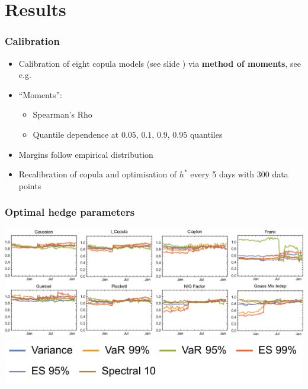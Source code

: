 \documentclass[10pt,mathserif]{beamer}
\renewcommand{\(}{\begin{columns}}
\renewcommand{\)}{\end{columns}}
\newcommand{\<}[1]{\begin{column}{#1}}
\renewcommand{\>}{\end{column}}
\theoremstyle{definition}
\begin{document}
\section{Results}

\begin{frame}
  \frametitle{Calibration}
  \begin{itemize}
    \addtolength{\itemsep}{3pt}
  \item Calibration of eight copula models (see slide
    \hyperlink{copulas}{}) via {\bf method
      of moments}, see e.g.\ \citep{Genest1993,Oh2013}
  \item ``Moments'':
    \begin{itemize}
      \addtolength{\itemsep}{3pt}
    \item Spearman's Rho
    \item Quantile dependence at $0.05$, $0.1$, $0.9$,
      $0.95$ quantiles
    \end{itemize}

  \item Margins follow empirical distribution
  \item Recalibration of copula and optimisation of $h^\ast$ every 5
    days with 300 data points 
  \end{itemize}
\end{frame}


  
\begin{frame}
  \frametitle{Optimal hedge parameters}
  \hspace*{-.75cm}\includegraphics[scale=.65]{../_pics/hParams.pdf}\\
  \includegraphics[scale=.85]{../_pics/hParams_Legend.pdf}
\end{frame}
\end{document}
